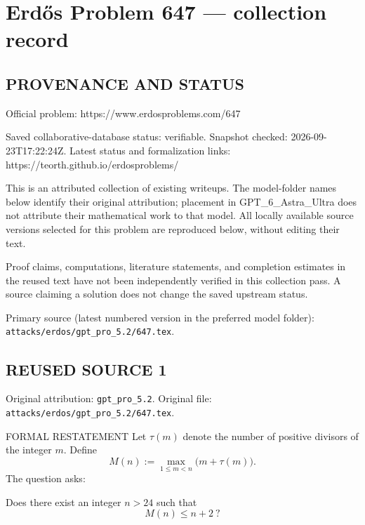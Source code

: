\section*{Erd\H{o}s Problem 647 --- collection record}

\subsection*{PROVENANCE AND STATUS}
Official problem: https://www.erdosproblems.com/647

Saved collaborative-database status: verifiable.
Snapshot checked: 2026-09-23T17:22:24Z.
Latest status and formalization links: https://teorth.github.io/erdosproblems/

This is an attributed collection of existing writeups. The model-folder names below identify their original attribution; placement in GPT\_6\_Astra\_Ultra does not attribute their mathematical work to that model. All locally available source versions selected for this problem are reproduced below, without editing their text.

Proof claims, computations, literature statements, and completion estimates in the reused text have not been independently verified in this collection pass. A source claiming a solution does not change the saved upstream status.

Primary source (latest numbered version in the preferred model folder): \texttt{attacks/erdos/gpt\_pro\_5.2/647.tex}.

\subsection*{REUSED SOURCE 1}
Original attribution: \texttt{gpt\_pro\_5.2}.
Original file: \texttt{attacks/erdos/gpt\_pro\_5.2/647.tex}.


FORMAL RESTATEMENT
Let $\tau(m)$ denote the number of positive divisors of the integer $m$.
Define
\[
M(n):=\max_{1\le m<n}\bigl(m+\tau(m)\bigr).
\]
The question asks:

\medskip
\noindent Does there exist an integer $n>24$ such that
\[
M(n)\le n+2\ ?
\]

